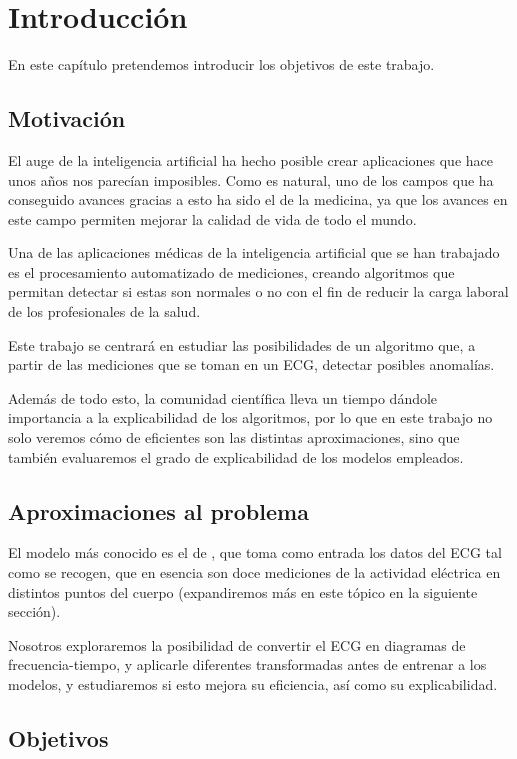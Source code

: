\chapter{Introducción}
\label{cap:introduccion}
\begin{resumen}
	En este capítulo pretendemos introducir los objetivos de este trabajo.
\end{resumen}

\section{Motivación}
El auge de la inteligencia artificial ha hecho posible crear aplicaciones que hace unos años nos parecían imposibles. Como es natural, uno de los campos que ha conseguido avances gracias a esto ha sido el de la medicina, ya que los avances en este campo permiten mejorar la calidad de vida de todo el mundo.

Una de las aplicaciones médicas de la inteligencia artificial que se han trabajado es el procesamiento automatizado de mediciones, creando algoritmos que permitan detectar si estas son normales o no con el fin de reducir la carga laboral de los profesionales de la salud.

Este trabajo se centrará en estudiar las posibilidades de un algoritmo que, a partir de las mediciones que se toman en un \ac{ECG}, detectar posibles anomalías.

Además de todo esto, la comunidad científica lleva un tiempo dándole importancia a la explicabilidad de los algoritmos, por lo que en este trabajo no solo veremos cómo de eficientes son las distintas aproximaciones, sino que también evaluaremos el grado de explicabilidad de los modelos empleados.

\section{Aproximaciones al problema}
El modelo más conocido es el de \cite{ribeiro}, que toma como entrada los datos del \ac{ECG} tal como se recogen, que en esencia son doce mediciones de la actividad eléctrica en distintos puntos del cuerpo (expandiremos más en este tópico en la siguiente sección).

Nosotros exploraremos la posibilidad de convertir el \ac{ECG} en diagramas de frecuencia-tiempo, y aplicarle diferentes transformadas antes de entrenar a los modelos, y estudiaremos si esto mejora su eficiencia, así como su explicabilidad.

\section{Objetivos}

